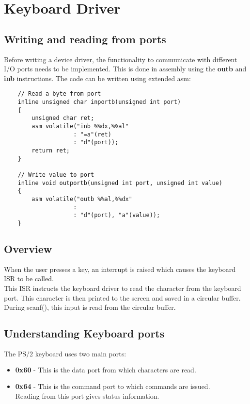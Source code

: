 \chapter{Keyboard Driver}\label{chapter:Keyboard Driver}

\section{Writing and reading from ports}\label{section:Writing and reading from ports}

Before writing a device driver, the functionality to communicate with different I/O ports needs to be implemented.
This is done in assembly using the \textbf{outb} and \textbf{inb} instructions.
The code can be written using extended asm:

\begin{lstlisting}
    // Read a byte from port
    inline unsigned char inportb(unsigned int port)
    {
        unsigned char ret;
        asm volatile("inb %%dx,%%al"
                    : "=a"(ret)
                    : "d"(port));
        return ret;
    }

    // Write value to port
    inline void outportb(unsigned int port, unsigned int value)
    {
        asm volatile("outb %%al,%%dx"
                    :
                    : "d"(port), "a"(value));
    }
\end{lstlisting}

\section{Overview}\label{Overview}

When the user presses a key, an interrupt is raised which causes the keyboard ISR to be called.\\
This ISR instructs the keyboard driver to read the character from the keyboard port. This character is then
printed to the screen and saved in a circular buffer. During scanf(), this input is read from the circular buffer.

\section{Understanding Keyboard ports}\label{section:Understanding Keyboard ports}
The PS/2 keyboard uses two main ports:
\begin{itemize}
    \item \textbf{0x60} - This is the data port from which characters are read.
    \item \textbf{0x64} - This is the command port to which commands are issued.\\
     Reading from this port gives status information.
\end{itemize}

